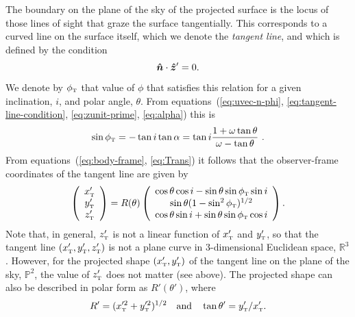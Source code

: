 The boundary on the plane of the sky of the projected surface is the
locus of those lines of sight that graze the surface tangentially.
This corresponds to a curved line on the surface itself, which we
denote the \textit{tangent line}, and which is defined by the
condition  
\begin{equation}
  \label{eq:tangent-line-condition}
  \bm{\hat{n}} \cdot \bm{\hat{z}}' = 0.
\end{equation}
We denote by \(\phi_{\mathrm{\scriptscriptstyle T}}\) that value of $\phi$ that satisfies this relation
for a given inclination, \(i\), and polar angle, \(\theta\).  From
equations~(\ref{eq:uvec-n-phi}, \ref{eq:tangent-line-condition},
\ref{eq:zunit-prime}, \ref{eq:alpha}) this is
\begin{equation}
\sin\phi_{\mathrm{\scriptscriptstyle T}} = -\tan i\tan\alpha = \tan i \frac{1+\omega\tan\theta}{\omega-\tan\theta} \ .
\label{eq:tanphi}
\end{equation}
From equations~(\ref{eq:body-frame}, \ref{eq:Trans}) it follows that
the observer-frame coordinates of the tangent line are given by
\begin{equation}
\left(\begin{array}{c}
x'_{\mathrm{\scriptscriptstyle T}} \\ y'_{\mathrm{\scriptscriptstyle T}} \\ z'_{\mathrm{\scriptscriptstyle T}}
\end{array}\right)= R(\theta)\left(\begin{array}{c}
\cos\theta\cos i - \sin\theta\sin\phi_{\mathrm{\scriptscriptstyle T}} \sin i \\
\sin\theta(1-\sin^2\phi_{\mathrm{\scriptscriptstyle T}})^{1/2} \\
\cos\theta\sin i +\sin\theta\sin\phi_{\mathrm{\scriptscriptstyle T}}\cos i
\end{array}\right).
\label{eq:tangential}
\end{equation} 
Note that, in general, \(z'_{\mathrm{\scriptscriptstyle T}}\) is not a linear function of \(x'_{\mathrm{\scriptscriptstyle T}}\)
and \(y'_{\mathrm{\scriptscriptstyle T}}\), so that the tangent line \((x'_{\mathrm{\scriptscriptstyle T}}, y'_{\mathrm{\scriptscriptstyle T}}, z'_{\mathrm{\scriptscriptstyle T}})\) is not a
plane curve in 3-dimensional Euclidean space, \(\mathds{R}^3\).
However, for the projected shape \((x'_{\mathrm{\scriptscriptstyle T}}, y'_{\mathrm{\scriptscriptstyle T}})\) of the tangent line
on the plane of the sky, \(\mathds{P}^2\), the value of \(z'_{\mathrm{\scriptscriptstyle T}}\) does
not matter (see above).  The projected shape can also be described in
polar form as \(R'(\theta')\), where
\begin{equation}
  \label{eq:R-prime-theta-prime}
  R' = (x'^2_{\mathrm{\scriptscriptstyle T}}+ y'^2_{\mathrm{\scriptscriptstyle T}})^{1/2} 
  \quad \text{and} \quad
  \tan\theta' = y'_{\mathrm{\scriptscriptstyle T}} / x'_{\mathrm{\scriptscriptstyle T}}.
\end{equation}

